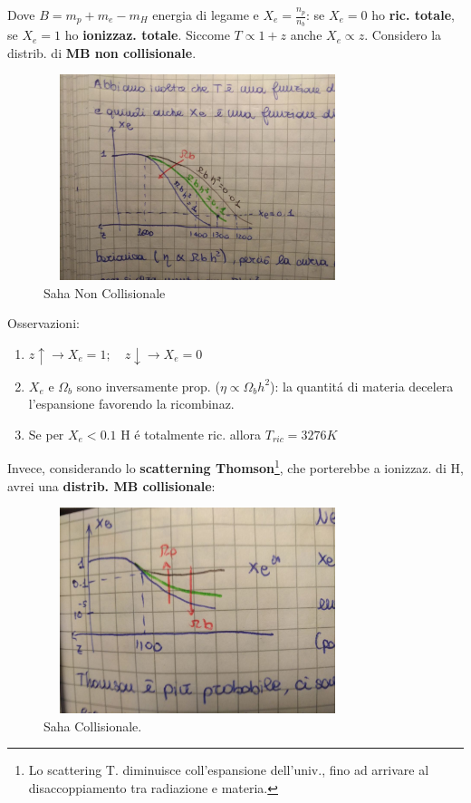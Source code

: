 \documentclass[12pt, a4paper]{article}
\begin{document}
Dove $B=m_p+m_e-m_H$ energia di legame e $X_e=\frac{n_p}{n_b}$: se $X_e=0$ ho \textbf{ric. totale}, se $X_e=1$ ho \textbf{ionizzaz. totale}. Siccome $T \propto 1+z$ anche  $X_e \propto z$. Considero la distrib. di \textbf{ MB non collisionale}.
\begin{figure}[htp]
    \centering
    \includegraphics[width=9cm, height=6cm]{images/ric1.jpeg}
    \caption{Saha Non Collisionale}
    \label{fig:ric1}
\end{figure}
Osservazioni:
\begin{enumerate}
\item  $z \uparrow \rightarrow X_e=1; \quad z \downarrow \rightarrow X_e=0 $
\item $X_e$ e $\Omega_b$ sono inversamente prop. ($\eta \propto \Omega_b h^2$): la quantit\'{a} di materia decelera l'espansione favorendo la ricombinaz.
\item Se per $ X_e<0.1$ H \'{e} totalmente ric. allora $T_{ric}=3276 K$ 
\end{enumerate}
Invece, considerando lo \textbf{scatterning Thomson}\footnote{Lo scattering T. diminuisce coll'espansione dell'univ., fino ad arrivare al disaccoppiamento tra radiazione e materia.}, che porterebbe a ionizzaz. di H, avrei una \textbf{distrib. MB collisionale}:
\begin{figure}[htp]
    \centering
    \includegraphics[width=9cm, height=6cm]{images/ric2.jpeg}
    \caption{Saha Collisionale.}
    \label{fig:ric2}
\end{figure}
\end{document}
